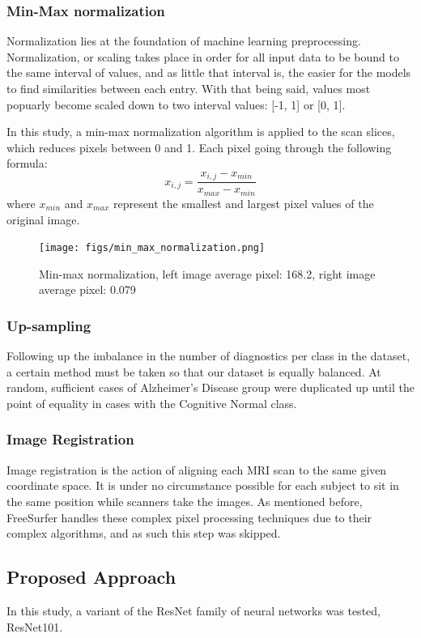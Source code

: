 \documentclass[a4paper, 12pt]{article}
\begin{document}
\subsubsection{Min-Max normalization}
Normalization lies at the foundation of machine learning preprocessing. Normalization, or scaling takes place in order for all input data to be bound to the same
interval of values, and as little that interval is, the easier for the models to find similarities between each entry. With that being said, values
most popuarly become scaled down to two interval values: [-1, 1] or [0, 1].

In this study, a min-max normalization algorithm is applied to the scan slices, which reduces pixels between 0 and 1. Each pixel going
through the following formula:
$$
    x_{i,j} = \frac{x_{i,j} - x_{min}}{x_{max} - x_{min}}
$$
where $x_{min}$ and $x_{max}$ represent the smallest and largest pixel values of the original image.

\begin{figure}[htbp]
    \centering
    \texttt{[image: figs/min\_max\_normalization.png]}
    \caption{Min-max normalization, left image average pixel: 168.2, right image average pixel: 0.079}
    \label{fig:min_max_normalization}
\end{figure}

\subsubsection{Up-sampling}
Following up the imbalance in the number of diagnostics per class in the dataset, a certain method must be taken so that our dataset is equally balanced.
At random, sufficient cases of Alzheimer's Disease group were duplicated up until the point of equality in cases with the Cognitive Normal class.

\subsubsection{Image Registration}
Image registration is the action of aligning each MRI scan to the same given coordinate space. It is under no circumstance possible for each
subject to sit in the same position while scanners take the images. As mentioned before, FreeSurfer handles these complex pixel processing techniques
due to their complex algorithms, and as such this step was skipped.

\newpage
\subsection{Proposed Approach}
In this study, a variant of the ResNet family of neural networks was tested, ResNet101.
\end{document}
